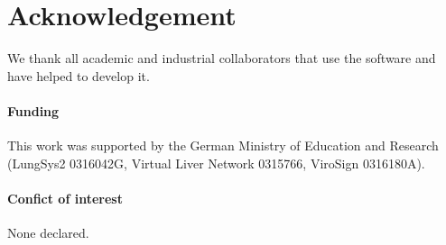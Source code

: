 \documentclass{bioinfo}
\begin{document}
\section*{Acknowledgement}
We thank all academic and industrial collaborators that use the software  
and have helped to develop it.

\paragraph{Funding\textcolon} 
This work was supported by the German Ministry of Education and Research (LungSys2 
0316042G, Virtual Liver Network 0315766, ViroSign 0316180A).

\paragraph{Confict of interest\textcolon} None declared.



\end{document}
